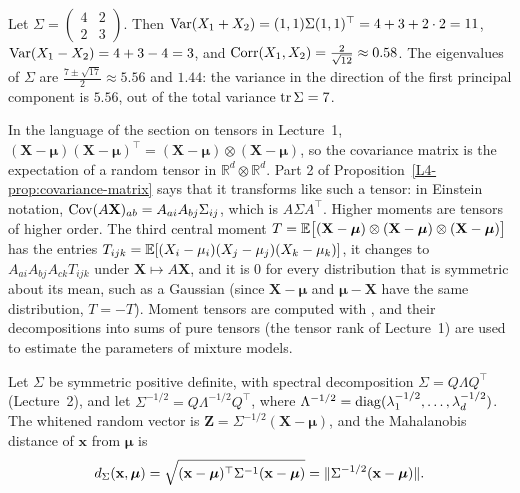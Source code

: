\begin{example}\label{L4-ex:covariance-matrix}
    Let $\Sigma = \begin{pmatrix} 4 & 2 \\ 2 & 3 \end{pmatrix}$. Then $\operatorname{Var}(X_1 + X_2) = (1, 1)\Sigma(1, 1)^\top = 4 + 3 + 2 \cdot 2 = 11$, $\operatorname{Var}(X_1 - X_2) = 4 + 3 - 4 = 3$, and $\operatorname{Corr}(X_1, X_2) = \frac{2}{\sqrt{12}} \approx 0.58$. The eigenvalues of $\Sigma$ are $\frac{7 \pm \sqrt{17}}{2} \approx 5.56$ and $1.44$: the variance in the direction of the first principal component is $5.56$, out of the total variance $\operatorname{tr}\Sigma = 7$.
\end{example}

\begin{remark}
    In the language of the section on tensors in Lecture~1, $(\mathbf{X} - \boldsymbol{\mu})(\mathbf{X} - \boldsymbol{\mu})^\top = (\mathbf{X} - \boldsymbol{\mu}) \otimes (\mathbf{X} - \boldsymbol{\mu})$, so the covariance matrix is the expectation of a random tensor in $\mathbb{R}^d \otimes \mathbb{R}^d$. Part 2 of Proposition~\ref{L4-prop:covariance-matrix} says that it transforms like such a tensor: in Einstein notation, $\operatorname{Cov}(A\mathbf{X})_{ab} = A_{ai}A_{bj}\Sigma_{ij}$, which is $A\Sigma A^\top$. Higher moments are tensors of higher order. The third central moment $T = \mathbb{E}\big[(\mathbf{X} - \boldsymbol{\mu}) \otimes (\mathbf{X} - \boldsymbol{\mu}) \otimes (\mathbf{X} - \boldsymbol{\mu})\big]$ has the entries $T_{ijk} = \mathbb{E}[(X_i - \mu_i)(X_j - \mu_j)(X_k - \mu_k)]$, it changes to $A_{ai}A_{bj}A_{ck}T_{ijk}$ under $\mathbf{X} \mapsto A\mathbf{X}$, and it is $0$ for every distribution that is symmetric about its mean, such as a Gaussian (since $\mathbf{X} - \boldsymbol{\mu}$ and $\boldsymbol{\mu} - \mathbf{X}$ have the same distribution, $T = -T$). Moment tensors are computed with , and their decompositions into sums of pure tensors (the tensor rank of Lecture~1) are used to estimate the parameters of mixture models.
\end{remark}

\begin{definition}\label{L4-def:whitening}
    Let $\Sigma$ be symmetric positive definite, with spectral decomposition $\Sigma = Q\Lambda Q^\top$ (Lecture~2), and let $\Sigma^{-1/2} = Q\Lambda^{-1/2}Q^\top$, where $\Lambda^{-1/2} = \operatorname{diag}(\lambda_1^{-1/2}, \ldots, \lambda_d^{-1/2})$. The whitened random vector is $\mathbf{Z} = \Sigma^{-1/2}(\mathbf{X} - \boldsymbol{\mu})$, and the Mahalanobis distance of $\mathbf{x}$ from $\boldsymbol{\mu}$ is
    \[d_\Sigma(\mathbf{x}, \boldsymbol{\mu}) = \sqrt{(\mathbf{x} - \boldsymbol{\mu})^\top\Sigma^{-1}(\mathbf{x} - \boldsymbol{\mu})} = \lVert \Sigma^{-1/2}(\mathbf{x} - \boldsymbol{\mu}) \rVert.\]
\end{definition}

